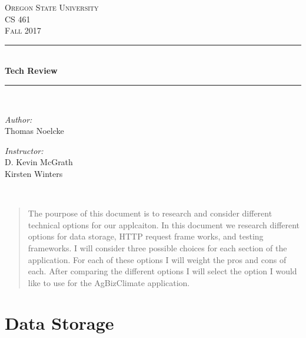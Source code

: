 \documentclass[letterpaper,10pt]{article}
\begin{document}
    \begin{titlepage}
    \newcommand{\HRule}{\rule{\linewidth}{0.5mm}}
    \center
    \textsc{\Large Oregon State University}\\[1.5cm]
    \textsc{\Large CS 461}\\[0.5cm]
    \textsc{\Large Fall 2017}\\[0.5cm]
    \HRule \\[0.4cm]
    { \huge \bfseries Tech Review}\\[0.4cm] %
    \HRule \\[1.5cm]
    \begin{minipage}{0.4\textwidth}
        \begin{flushleft} \large
        \emph{Author:}\\
        Thomas Noelcke
        \end{flushleft}
    \end{minipage}
    \begin{minipage}{0.4\textwidth}
        \begin{flushright} \large
        \emph{Instructor:} \\
        D. Kevin McGrath\\
        Kirsten Winters
        \end{flushright}
    \end{minipage}\\[2cm]
    \begin{abstract}
    \item 
		The pourpose of this document is to research and consider different technical options for our applcaiton. In this document we research different options for data storage, HTTP request frame works, and testing frameworks. I will consider three possible choices for each section of the application. For each of these options I will weight the pros and cons of each. After comparing the different options I will select the option I would like to use for the AgBizClimate application.
    \end{abstract}
    \vfill %
    \end{titlepage}
		
\section{Data Storage}
\end{document}
